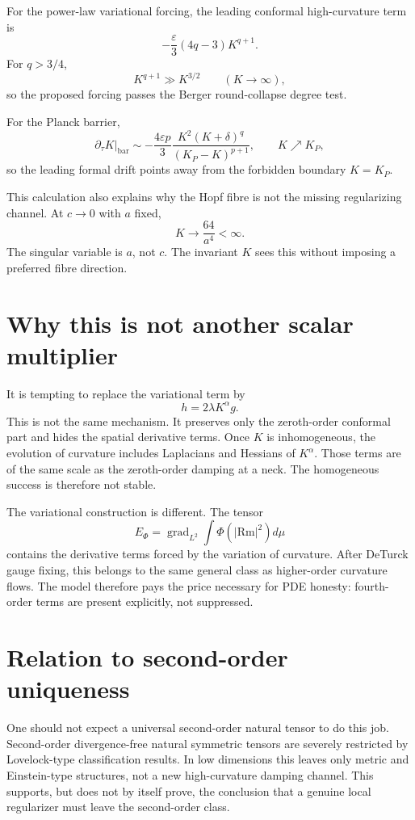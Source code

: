 \documentclass[11pt]{amsart}
\newcommand{\Rm}{\mathrm{Rm}}
\newcommand{\grad}{\operatorname{grad}}
\newcommand{\dt}{\partial_\tau}
\newcommand{\KP}{K_{\!P}}
\begin{document}
For the power-law variational forcing, the leading conformal high-curvature
term is
\[
        -\frac{\varepsilon}{3}(4q-3)K^{q+1}.
\]
For \(q>3/4\),
\[
        K^{q+1}\gg K^{3/2}
        \qquad (K\to\infty),
\]
so the proposed forcing passes the Berger round-collapse degree test.

For the Planck barrier,
\[
        \dt K\big|_{\mathrm{bar}}
        \sim
        -
        \frac{4\varepsilon p}{3}
        \frac{K^2(K+\delta)^q}{(\KP-K)^{p+1}},
        \qquad K\nearrow\KP,
\]
so the leading formal drift points away from the forbidden boundary
\(K=\KP\).

This calculation also explains why the Hopf fibre is not the missing
regularizing channel.  At \(c\to0\) with \(a\) fixed,
\[
        K\to \frac{64}{a^4}<\infty.
\]
The singular variable is \(a\), not \(c\).  The invariant \(K\) sees this
without imposing a preferred fibre direction.

\section{Why this is not another scalar multiplier}

It is tempting to replace the variational term by
\[
        h=2\lambda K^\alpha g.
\]
This is not the same mechanism.  It preserves only the zeroth-order conformal
part and hides the spatial derivative terms.  Once \(K\) is inhomogeneous,
the evolution of curvature includes Laplacians and Hessians of \(K^\alpha\).
Those terms are of the same scale as the zeroth-order damping at a neck.  The
homogeneous success is therefore not stable.

The variational construction is different.  The tensor
\[
        E_\Phi=\grad_{L^2}\int \Phi(|\Rm|^2)d\mu
\]
contains the derivative terms forced by the variation of curvature.  After
DeTurck gauge fixing, this belongs to the same general class as higher-order
curvature flows.  The model therefore pays the price necessary for PDE
honesty: fourth-order terms are present explicitly, not suppressed.

\section{Relation to second-order uniqueness}

One should not expect a universal second-order natural tensor to do this job.
Second-order divergence-free natural symmetric tensors are severely restricted
by Lovelock-type classification results.  In low dimensions this leaves only
metric and Einstein-type structures, not a new high-curvature damping channel.
This supports, but does not by itself prove, the conclusion that a genuine
local regularizer must leave the second-order class.
\end{document}
